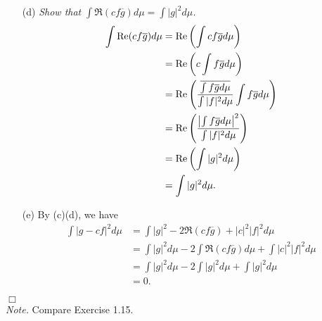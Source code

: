 \documentclass{article}
\begin{document}
\begin{enumerate}
\begin{enumerate}
  \item[(d)]
    \emph{Show that $\int \Re(cf\overline{g}) d\mu = \int |g|^2 d\mu$.}
    \begin{align*}
      \int \Re(cf\overline{g}) d\mu
      &= \Re\left( \int cf\overline{g} d\mu \right) \\
      &= \Re\left( c \int f\overline{g} d\mu \right) \\
      &= \Re\left( \frac{\overline{\int f\overline{g} d\mu}}{\int |f|^2 d\mu}
        \int f\overline{g} d\mu \right) \\
      &= \Re\left( \frac{\abs{\int f\overline{g} d\mu}^2}{\int |f|^2 d\mu} \right) \\
      &= \Re\left( \int |g|^2 d\mu \right) \\
      &= \int |g|^2 d\mu.
    \end{align*}

  \item[(e)]
    By (c)(d), we have
    \begin{align*}
      \int |g-cf|^2 d\mu
      &= \int |g|^2 - 2\Re(cf\overline{g}) + |c|^2|f|^2 d\mu \\
      &= \int |g|^2 d\mu - 2 \int \Re(cf\overline{g}) d\mu + \int |c|^2|f|^2 d\mu \\
      &= \int |g|^2 d\mu - 2 \int |g|^2 d\mu + \int |g|^2 d\mu \\
      &= 0.
    \end{align*}
  \end{enumerate}
\end{enumerate}
$\Box$ \\



\emph{Note.}
Compare Exercise 1.15. \\\\



\end{document}
